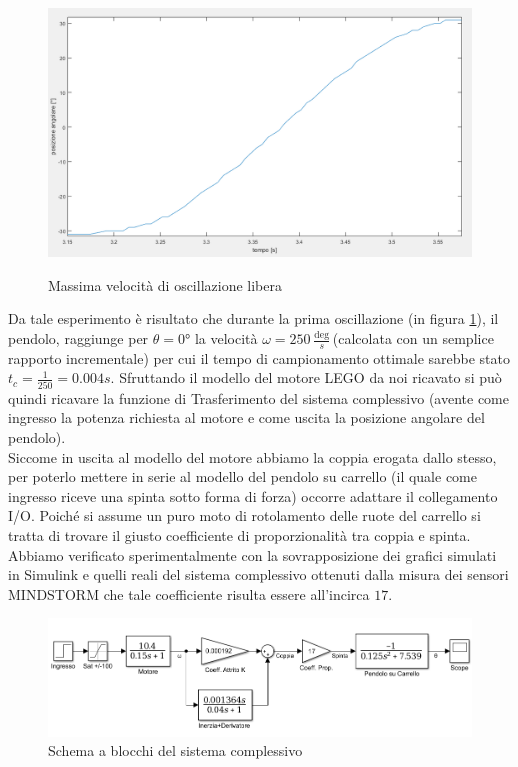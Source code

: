 \begin{figure}[ht]
	\centering
	\includegraphics[scale=0.4]{SlewRate.PNG}\\
	\caption{Massima velocità di oscillazione libera}
	\label{slewRate}
\end{figure}
Da tale esperimento è risultato che durante la prima oscillazione (in figura \ref{slewRate}), il pendolo, raggiunge per $\theta=\ang{0}$ la velocità $\omega=250\frac{\deg}{s}$(calcolata con un semplice rapporto incrementale) per cui il tempo di campionamento ottimale sarebbe stato $t_c=\displaystyle\frac{1}{250}=0.004s$.
Sfruttando il modello del motore LEGO da noi ricavato si può quindi ricavare la funzione di Trasferimento del sistema complessivo (avente come ingresso la potenza richiesta al motore e come uscita la posizione angolare del pendolo).\\
Siccome in uscita al modello del motore abbiamo la coppia erogata dallo stesso, per poterlo mettere in serie al modello del pendolo su carrello (il quale come ingresso riceve una spinta sotto forma di forza) occorre adattare il collegamento I/O. Poiché si assume un puro moto di rotolamento delle ruote del carrello si tratta di trovare il giusto coefficiente di proporzionalità tra coppia e spinta.
Abbiamo verificato sperimentalmente con la sovrapposizione dei grafici simulati in Simulink e quelli reali del sistema complessivo ottenuti dalla misura dei sensori MINDSTORM che tale coefficiente risulta essere all'incirca $17$.
\begin{figure}[ht]
	\centering
	\includegraphics[width=\textwidth]{SisComplessivoPendoloNormale.PNG}
	\caption{Schema a blocchi del sistema complessivo}
	\label{SisComplessivoPendoloNormale}
\end{figure}
